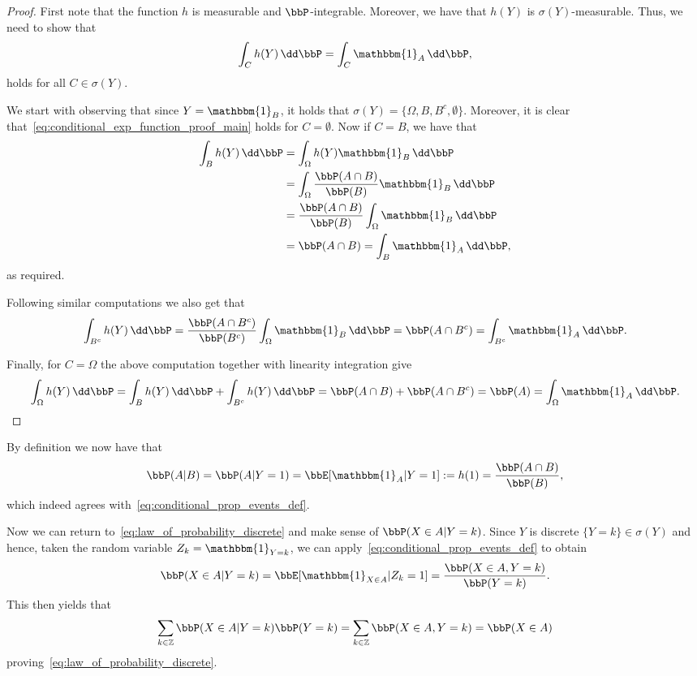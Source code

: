 \begin{proof}
First note that the function $h$ is measurable and $\bbP$-integrable. Moreover, we have that $h(Y)$ is $\sigma(Y)$-measurable. Thus, we need to show that
\begin{equation}\label{eq:conditional_exp_function_proof_main}
	\int_C h(Y) \, \dd \bbP = \int_C \mathbbm{1}_A \, \dd \bbP,
\end{equation}
holds for all $C \in \sigma(Y)$.

We start with observing that since $Y = \mathbbm{1}_B$, it holds that $\sigma(Y) = \{\Omega, B, B^c, \emptyset\}$. Moreover, it is clear that~\eqref{eq:conditional_exp_function_proof_main} holds for $C = \emptyset$. Now if $C = B$, we have that
\begin{align*}
	\int_B h(Y) \, \dd \bbP &= \int_\Omega h(Y) \mathbbm{1}_B \, \dd \bbP \\
	&= \int_\Omega \frac{\bbP(A \cap B)}{\bbP(B)} \mathbbm{1}_B \, \dd \bbP \\
	&= \frac{\bbP(A \cap B)}{\bbP(B)} \int_\Omega \mathbbm{1}_B \, \dd \bbP \\
	&= \bbP(A \cap B) = \int_B \mathbbm{1}_A \, \dd \bbP,
\end{align*}
as required.

Following similar computations we also get that
\[
	\int_{B^c} h(Y) \, \dd \bbP = \frac{\bbP(A \cap B^c)}{\bbP(B^c)} \int_\Omega \mathbbm{1}_B \, \dd \bbP
	= \bbP(A \cap B^c) = \int_{B^c} \mathbbm{1}_A \, \dd \bbP.
\]

Finally, for $C = \Omega$ the above computation together with linearity integration give
\[
	\int_\Omega h(Y) \, \dd \bbP = \int_B h(Y) \, \dd \bbP + \int_{B^c} h(Y) \, \dd \bbP
	= \bbP(A \cap B) + \bbP(A \cap B^c) = \bbP(A) = \int_\Omega \mathbbm{1}_A \, \dd \bbP.
\]
\end{proof}

By definition we now have that 
\[
	\bbP(A | B) = \bbP(A | Y = 1) = \bbE[\mathbbm{1}_A | Y = 1] := h(1) = \frac{\bbP(A \cap B)}{\bbP(B)},
\]
which indeed agrees with~\eqref{eq:conditional_prop_events_def}.


Now we can return to~\eqref{eq:law_of_probability_discrete} and make sense of $\bbP(X \in A | Y = k)$. Since $Y$ is discrete $\{Y = k\} \in \sigma(Y)$ and hence, taken the random variable $Z_k = \mathbbm{1}_{Y = k}$, we can apply~\ref{eq:conditional_prop_events_def} to obtain 
\[
	\bbP(X \in A | Y = k) = \bbE[\mathbbm{1}_{X \in A} | Z_k = 1]
	= \frac{\bbP(X \in A, Y = k)}{\bbP(Y = k)}.
\]
This then yields that
\[
	\sum_{k \in \mathbb{Z}} \bbP(X \in A | Y = k) \bbP(Y = k) 
	= \sum_{k \in \mathbb{Z}} \bbP(X \in A, Y = k) = \bbP(X \in A)
\]
proving~\eqref{eq:law_of_probability_discrete}.

